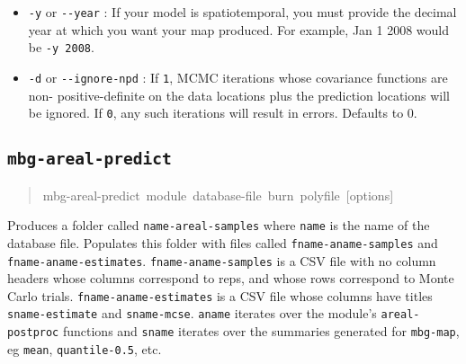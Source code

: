 \begin{itemize}
\item \texttt{-y} or \texttt{-{}-year} : If your model is spatiotemporal, you must provide the decimal year at
which you want your map produced. For example, Jan 1 2008 would be \texttt{-y 2008}.

\item \texttt{-d} or \texttt{-{}-ignore-npd} : If \texttt{1}, MCMC iterations whose covariance functions are non-
positive-definite on the data locations plus the prediction locations will be ignored. If
\texttt{0}, any such iterations will result in errors. Defaults to 0.

\end{itemize}




\subsection{\texttt{mbg-areal-predict}%
}
%
\begin{quote}{\ttfamily \raggedright \noindent
mbg-areal-predict~module~database-file~burn~polyfile~{[}options{]}
}
\end{quote}

Produces a folder called \texttt{name-areal-samples} where \texttt{name} is the name of the
database file. Populates this folder with files called \texttt{fname-aname-samples} and
\texttt{fname-aname-estimates}. \texttt{fname-aname-samples} is a CSV file with no column
headers whose columns correspond to reps, and whose rows correspond to Monte Carlo
trials. \texttt{fname-aname-estimates} is a CSV file whose columns have titles
\texttt{sname-estimate} and \texttt{sname-mcse}. \texttt{aname} iterates over the module's
\texttt{areal-postproc} functions and \texttt{sname} iterates over the summaries generated for
\texttt{mbg-map}, eg \texttt{mean}, \texttt{quantile-0.5}, etc.




